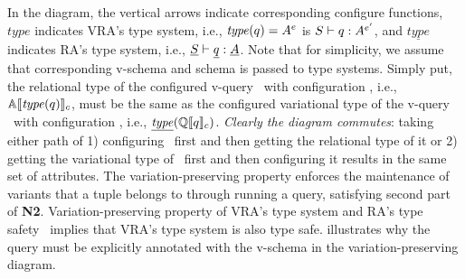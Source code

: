 %
\begin{wrapfigure}{r}{0.2\textwidth}
\begin{center}
\end{center}
\end{wrapfigure}
%
In the diagram, 
the vertical arrows indicate corresponding configure functions,
\ensuremath{\mathit{type}} indicates VRA's type system, 
i.e., \ensuremath{\mathit{type}(\vQ) = \annot \vAttList} is 
\ensuremath{\envWithoutVctx \vQ {\envInContext [\VVal \vctx] \vType}},
and
\ensuremath{\underline{\mathit{type}}} indicates RA's type system,
i.e., \ensuremath{\pEnv {\pQ} {\pAttList}}.
Note that for simplicity, we assume that corresponding v-schema and schema is
passed to type systems.
Simply put, 
the relational type of the configured v-query \vQ\ with configuration \config, 
i.e., \ensuremath{\olSem {\mathit{type} (q)}},
must be the same as the configured variational type 
of the v-query \vQ\ with configuration \config, 
i.e., \ensuremath{\underline {\mathit{type}} (\eeSem {\vQ})}.
\emph{Clearly the diagram commutes}: taking either path of 1) configuring \vQ\ first and 
then getting the relational type of it or 
2) getting the variational type of \vQ\ first and then configuring it results
in the same set of attributes. 
The variation-preserving property enforces the maintenance of variants that a tuple
belongs to through running a query, satisfying second part of \textbf{N2}.
%
Variation-preserving property of VRA's type system and RA's type safety~\cite{RAtypeSys} 
implies that VRA's type system is also type safe.
 illustrates why the query must be explicitly annotated with the v-schema
in the variation-preserving diagram.


